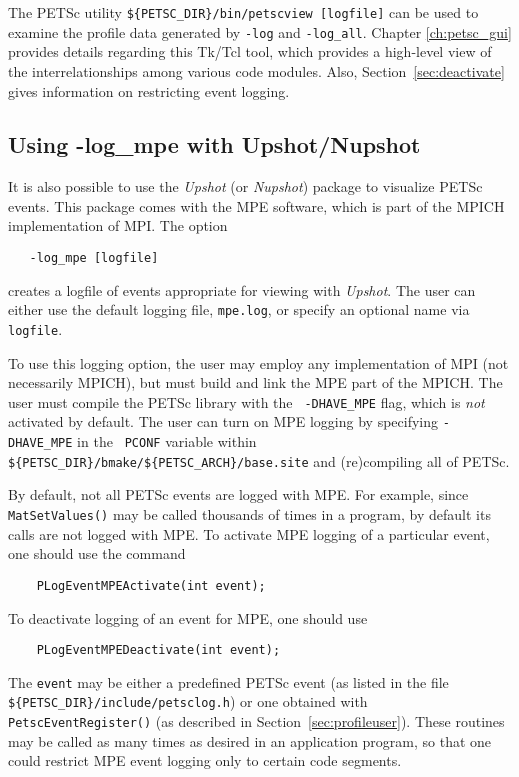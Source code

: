 The PETSc utility {\tt \$\{PETSC\_DIR\}/bin/petscview [logfile]}
 can be used to examine the profile data generated by
{\tt -log} and {\tt -log\_all}.  Chapter \ref{ch:petsc_gui} provides
details regarding this Tk/Tcl tool, which provides a high-level view of
the interrelationships among various code modules. Also,
Section~\ref{sec:deactivate} gives information on restricting event logging.

\subsection{Using -log\_mpe with Upshot/Nupshot}
\label{sec:mpelogs}

It is also possible to use the {\em Upshot} (or {\em Nupshot}) package
\cite{upshot}    to visualize PETSc events. 
This package comes with the MPE software, which is part of the MPICH
\cite{mpich-web-page} implementation of MPI.
The option 
\begin{verbatim}
   -log_mpe [logfile]
\end{verbatim}
creates a logfile of events appropriate for viewing with {\em Upshot}.
The user can either use the default logging file, {\tt mpe.log}, or
specify an optional name via {\tt logfile}.  

To use this logging option, the user may employ any implementation of
MPI (not necessarily MPICH), but must build and link the MPE part of
the MPICH.  The user must compile the PETSc library with the {\tt
-DHAVE\_MPE} flag, which is {\em not} activated by default. The user
can turn on MPE logging by specifying {\tt -DHAVE\_MPE} in the {\tt
PCONF} variable within {\tt
\$\{PETSC\_DIR\}/bmake/\$\{PETSC\_ARCH\}/base.site} and (re)compiling all
of PETSc.

By default, not all PETSc events are logged with MPE. For example,
since {\tt MatSetValues()} may be called thousands of times in a program,
by default its calls are not logged with MPE. To activate MPE logging of
a particular event, one should use the command 
\begin{verbatim}
    PLogEventMPEActivate(int event);
\end{verbatim}
To deactivate logging of an event for MPE, one should use 
\begin{verbatim}
    PLogEventMPEDeactivate(int event);
\end{verbatim}
The {\tt event} may be either a predefined PETSc event (as listed in
the file {\tt \$\{PETSC\_DIR\}/include/petsclog.h}) or one obtained with
{\tt PetscEventRegister()} (as described in
Section~\ref{sec:profileuser}).  These routines may be called as many
times as desired in an application program, so that one could restrict
MPE event logging only to certain code segments.

